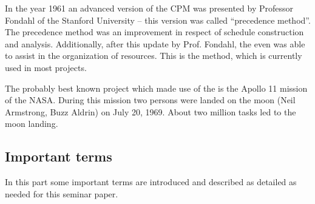In the year 1961 an advanced version of the CPM was presented by Professor Fondahl of the Stanford
University – this version was called “precedence method”. The precedence method was an improvement
in respect of schedule construction and analysis. Additionally, after this update by Prof. Fondahl,
the \cpm{} even was able to assist in the organization of resources. This is the
method, which is currently used in most projects\cite{Uher}.

The probably best known project which made use of the \cpm{} is the Apollo 11 mission
of the NASA. During this mission two persons were landed on the moon (Neil Armstrong, Buzz Aldrin)
on July 20, 1969. About two million tasks led to the moon landing. 

\subsection{Important terms} \label{important_terms}

In this part some important terms are introduced and described as detailed as needed for this
seminar paper. 

